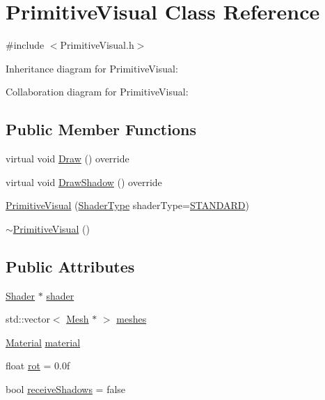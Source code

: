 \hypertarget{class_primitive_visual}{}\section{Primitive\+Visual Class Reference}
\label{class_primitive_visual}


{\ttfamily \#include $<$Primitive\+Visual.\+h$>$}



Inheritance diagram for Primitive\+Visual\+:


Collaboration diagram for Primitive\+Visual\+:
\subsection*{Public Member Functions}
\begin{DoxyCompactItemize}
\item 
virtual void \mbox{\hyperlink{class_primitive_visual_a9ce21acf4bb9b9d9ac24c75f6aa9aec3}{Draw}} () override
\item 
virtual void \mbox{\hyperlink{class_primitive_visual_a67915de082572ca4f6467c1402587024}{Draw\+Shadow}} () override
\item 
\mbox{\hyperlink{class_primitive_visual_a8198e82c2dc99af36b96a2ad35ec36aa}{Primitive\+Visual}} (\mbox{\hyperlink{_game_object_8h_a6230e1b9ecbf2d82d10856fd7e1fde46}{Shader\+Type}} shader\+Type=\mbox{\hyperlink{_texture_8h_a65468556d79304b3a4bfc464cc12e549a94e94133f4bdc1794c6b647b8ea134d0}{S\+T\+A\+N\+D\+A\+RD}})
\item 
\mbox{\hyperlink{class_primitive_visual_a2d1ca03da960111c6cce0852e02b10f6}{$\sim$\+Primitive\+Visual}} ()
\end{DoxyCompactItemize}
\subsection*{Public Attributes}
\begin{DoxyCompactItemize}
\item 
\mbox{\hyperlink{class_shader}{Shader}} $\ast$ \mbox{\hyperlink{class_primitive_visual_a463e83ee34d0727a19cf417f74ea67e7}{shader}}
\item 
std\+::vector$<$ \mbox{\hyperlink{class_mesh}{Mesh}} $\ast$ $>$ \mbox{\hyperlink{class_primitive_visual_a12252f7d680eb47471a13d121c0898d5}{meshes}}
\item 
\mbox{\hyperlink{struct_material}{Material}} \mbox{\hyperlink{class_primitive_visual_a775945d5dc204a98315eda90d6482278}{material}}
\item 
float \mbox{\hyperlink{class_primitive_visual_ae1cf9c3c3df2513f00cda8d788404bec}{rot}} = 0.\+0f
\item 
bool \mbox{\hyperlink{class_primitive_visual_ab3f6291a1a2914f0403ae118f8d9d8e5}{receive\+Shadows}} = false
\end{DoxyCompactItemize}


